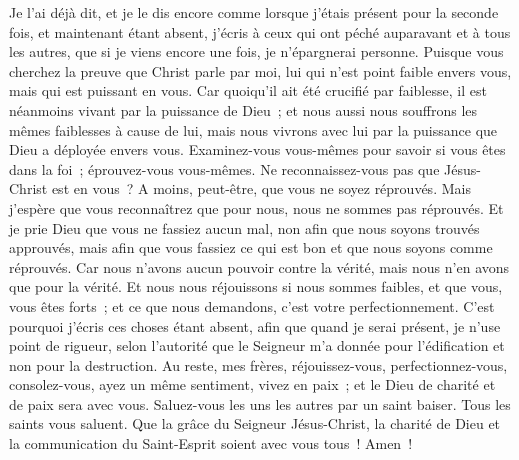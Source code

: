 \begin{multicols}{2}
Je l'ai déjà dit, et je le dis encore comme lorsque j'étais présent pour la seconde fois, et maintenant étant absent, j'écris à ceux qui ont péché auparavant et à tous les autres, que si je viens encore une fois, je n'épargnerai personne.
Puisque vous cherchez la preuve que Christ parle par moi, lui qui n'est point faible envers vous, mais qui est puissant en vous.
Car quoiqu'il ait été crucifié par faiblesse, il est néanmoins vivant par la puissance de Dieu~; et nous aussi nous souffrons les mêmes faiblesses à cause de lui, mais nous vivrons avec lui par la puissance que Dieu a déployée envers vous.
Examinez-vous vous-mêmes pour savoir si vous êtes dans la foi~; éprouvez-vous vous-mêmes. Ne reconnaissez-vous pas que Jésus-Christ est en vous~? A moins, peut-être, que vous ne soyez réprouvés.
Mais j'espère que vous reconnaîtrez que pour nous, nous ne sommes pas réprouvés.
Et je prie Dieu que vous ne fassiez aucun mal, non afin que nous soyons trouvés approuvés, mais afin que vous fassiez ce qui est bon et que nous soyons comme réprouvés.
Car nous n'avons aucun pouvoir contre la vérité, mais nous n'en avons que pour la vérité.
Et nous nous réjouissons si nous sommes faibles, et que vous, vous êtes forts~; et ce que nous demandons, c'est votre perfectionnement.
C'est pourquoi j'écris ces choses étant absent, afin que quand je serai présent, je n'use point de rigueur, selon l'autorité que le Seigneur m'a donnée pour l'édification et non pour la destruction.
Au reste, mes frères, réjouissez-vous, perfectionnez-vous, consolez-vous, ayez un même sentiment, vivez en paix~; et le Dieu de charité et de paix sera avec vous.
Saluez-vous les uns les autres par un saint baiser. Tous les saints vous saluent.
Que la grâce du Seigneur Jésus-Christ, la charité de Dieu et la communication du Saint-Esprit soient avec vous tous~! Amen~!
\PPE{}
\end{multicols}
